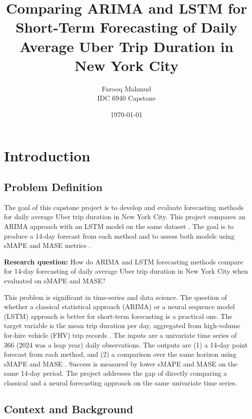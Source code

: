 \documentclass[12pt, a4paper]{article}
\title{Comparing ARIMA and LSTM for Short-Term Forecasting of Daily Average Uber Trip Duration in New York City}
\author{Farooq Mahmud\\[0.5em] \normalsize IDC 6940 Capstone}
\date{\today}
\begin{document}
\pagestyle{plain}
\maketitle
\tableofcontents
\clearpage

\section{Introduction}

\subsection{Problem Definition}

The goal of this capstone project is to develop and evaluate forecasting methods for daily average Uber trip duration in New York City. This project compares an ARIMA approach with an LSTM model on the same dataset \cite{nyctlc2024}. The goal is to produce a 14-day forecast from each method and to assess both models using sMAPE and MASE metrics \cite{hyndman2006,prabhat2024}.

\textbf{Research question:} How do ARIMA and LSTM forecasting methods compare for 14-day forecasting of daily average Uber trip duration in New York City when evaluated on sMAPE and MASE?

This problem is significant in time-series and data science. The question of whether a classical statistical approach (ARIMA) or a neural sequence model (LSTM) approach is better for short-term forecasting is a practical one. The target variable is the mean trip duration per day, aggregated from high-volume for-hire vehicle (FHV) trip records \cite{nyctlc2024}. The inputs are a univariate time series of 366 (2024 was a leap year) daily observations. The outputs are (1) a 14-day point forecast from each method, and (2) a comparison over the same horizon using sMAPE and MASE \cite{hyndman2006,prabhat2024}. Success is measured by lower sMAPE and MASE on the same 14-day period. The project addresses the gap of directly comparing a classical and a neural forecasting approach on the same univariate time series.

\subsection{Context and Background}
\end{document}
